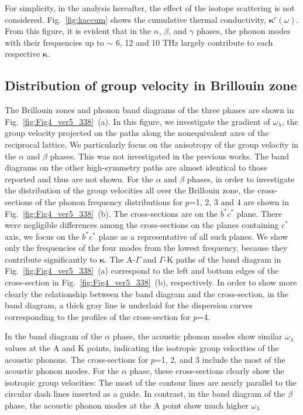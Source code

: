 \documentclass[twocolumn,amsmath,amssymb,a4paper,prb,superscriptaddress,floatfix]{revtex4-1}
\begin{document}
For simplicity, in the analysis hereafter, the effect of the isotope scattering
is not considered. Fig.~\ref{fig:kaccum} shows the cumulative thermal
conductivity, $\boldsymbol{\kappa}^c(\omega)$. 
From this figure, it is evident that in the
$\alpha$, $\beta$, and $\gamma$ phases, the phonon modes with their frequencies
up to $\sim$ 6, 12 and 10 THz largely contribute to each respective
$\boldsymbol{\kappa}$. 

\subsection{Distribution of group velocity in Brillouin zone}

The Brillouin zones and phonon band diagrams of the three phases are shown in
Fig.~\ref{fig:Fig4_ver5_338}~(a). In this figure, we investigate the 
gradient of $\omega_\lambda$, the group velocity projected on the paths along the nonequivalent
axes of the reciprocal lattice. We particularly focus on the anisotropy of the
group velocity in the $\alpha$ and $\beta$ phases. This was not investigated
in the previous works. The band diagrams on the other high-symmetry paths are
almost identical to those reported\cite{kuwabara,xu} and thus are not shown.
For the $\alpha$ and $\beta$ phases, in order to investigate the distribution of
the group velocities all over the Brillouin zone, the cross-sections of the
phonon frequency distributions for $p$=1, 2, 3 and 4 are shown in
Fig.~\ref{fig:Fig4_ver5_338}~(b). The cross-sections are on the $b^*c^*$ plane.
There were negligible differences among the cross-sections on the planes
containing $c^*$ axis, we focus on the $b^*c^*$ plane as a representative of all
such planes. We show only the frequencies of the four modes from the lowest
frequency, because they contribute significantly to
$\boldsymbol{\kappa}$.
The A-$\Gamma$ and $\Gamma$-K paths of the band diagram in
Fig.~\ref{fig:Fig4_ver5_338}~(a) correspond to the left and bottom edges of the
cross-section in Fig.~\ref{fig:Fig4_ver5_338}~(b), respectively.  In order to
show more clearly the relationship between the band diagram and the
cross-section, in the band diagram, a thick gray line is underlaid for the
dispersion curves corresponding to the profiles of the cross-section for $p$=4. 

In the band diagram of the $\alpha$ phase, the acoustic
phonon modes show similar $\omega_\lambda$ values at the A and K points, 
indicating the isotropic group velocities of the acoustic phonons.
The cross-sections for $p$=1, 2, and 3 include the most of the acoustic phonon
modes. 
For the $\alpha$ phase, these cross-sections clearly show the
isotropic group velocities: The most of the contour lines 
are nearly parallel to the circular dash lines inserted as a guide.  In contrast, in
the band diagram of the $\beta$ phase, the acoustic phonon modes at the A point show 
much higher $\omega_\lambda$ 
\end{document}
